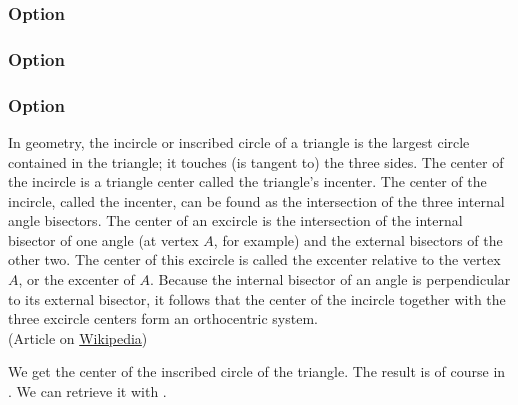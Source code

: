 \subsubsection{Option }
\begin{tkzexample}[latex=6cm,small]
\end{tkzexample}

\subsubsection{Option }
\begin{tkzexample}[latex=6cm,small]
\end{tkzexample}

\subsubsection{Option }
In geometry, the incircle or inscribed circle of a triangle is the largest circle contained in the triangle; it touches (is tangent to) the three sides. The center of the incircle is a triangle center called the triangle's incenter.
The center of the incircle, called the incenter, can be found as the intersection of the three internal angle bisectors. The center of an excircle is the intersection of the internal bisector of one angle (at vertex $A$, for example) and the external bisectors of the other two. The center of this excircle is called the excenter relative to the vertex $A$, or the excenter of $A$. Because the internal bisector of an angle is perpendicular to its external bisector, it follows that the center of the incircle together with the three excircle centers form an orthocentric system.\\
(Article on \href{https://en.wikipedia.org/wiki/Incircle_and_excircles_of_a_triangle}{Wikipedia})

 \medskip
 We get the center of the inscribed circle of the triangle. The result is of course in . We can retrieve it with .

